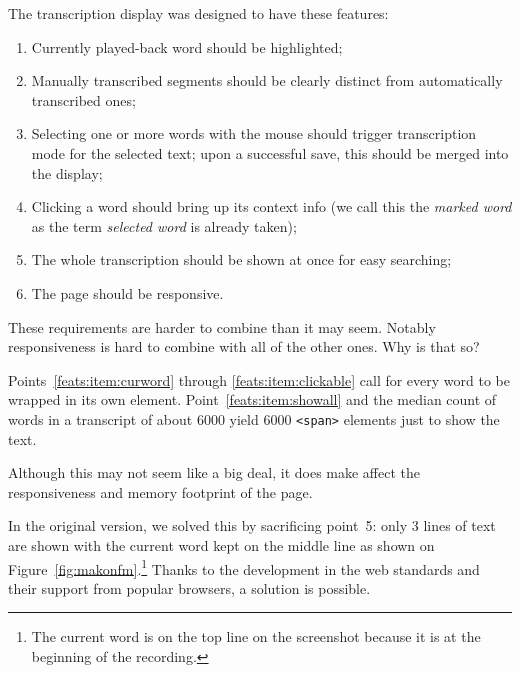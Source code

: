 \documentclass{svproc}
\begin{document}
The transcription display was designed to have these features:
\begin{enumerate}
\item{
    Currently played-back word should be highlighted;
    \label{feats:item:curword}
}
\item{
    Manually transcribed segments should be clearly distinct from automatically
    transcribed ones;
    \label{feats:item:manualdistinct}
}
\item{
    Selecting one or more words with the mouse should trigger transcription mode
    for the selected text;
    upon a successful save, this should be merged into the display;
    \label{feats:item:selectable}
}
\item{
    Clicking a word should bring up its context info (we call this the
    {\em marked word} as the term {\em selected word} is already taken);
    \label{feats:item:clickable}
}
\item{
    The whole transcription should be shown at once for easy searching;
    \label{feats:item:showall}
}
\item{
    The page should be responsive.\label{feats:item:speed}
}
\end{enumerate}

These requirements are harder to combine than it may seem. Notably
responsiveness is hard to combine with all of the other ones. Why is that so?

Points~\ref{feats:item:curword} through \ref{feats:item:clickable}
call for every word to be wrapped in its own element.
Point~\ref{feats:item:showall} and the median count of words in a transcript of
about 6000 yield 6000 \texttt{<span>} elements just to show the text. 

Although this may not seem like a big deal, it does make affect the
responsiveness and memory footprint of the page.

In the original version, we solved this by sacrificing point~5:
only 3 lines of text are shown with the current word kept on the middle line as
shown on Figure~\ref{fig:makonfm}.\footnote{The current word is on the top line
on the screenshot because it is at the beginning of the recording.} Thanks to
the development in the web standards and their support from popular browsers, a
solution is possible.
\end{document}

